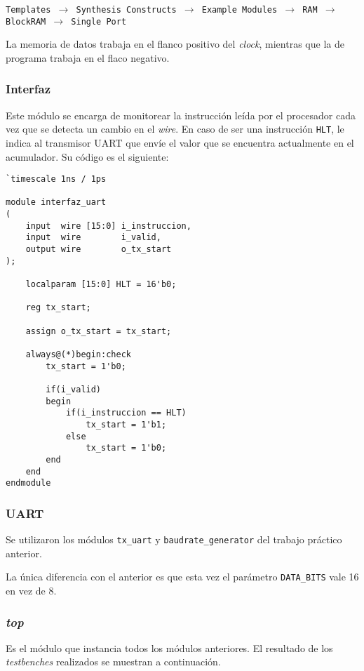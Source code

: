 \documentclass[12pt,a4paper]{article}
\begin{document}
\begin{center}

\footnotesize
\texttt{Templates $\rightarrow$ Synthesis Constructs $\rightarrow$  Example Modules $\rightarrow$  RAM $\rightarrow$ BlockRAM $\rightarrow$ Single Port}

\end{center}

La memoria de datos trabaja en el flanco positivo del \emph{clock}, mientras que la de programa trabaja en el flaco negativo.

\subsubsection{Interfaz}
\label{subss:iface}
Este módulo se encarga de monitorear la instrucción leída por el procesador cada vez que se detecta un cambio en el \emph{wire}. En caso de ser una instrucción \verb|HLT|, le indica al transmisor UART que envíe el valor que se encuentra actualmente en el acumulador. Su código es el siguiente:

\begin{lstlisting}[caption={Código fuente de ``interfaz\_uart''.}, label={cod:int-src}, language=ve]
`timescale 1ns / 1ps

module interfaz_uart
(
    input  wire [15:0] i_instruccion,
    input  wire        i_valid,
    output wire        o_tx_start
);

    localparam [15:0] HLT = 16'b0;

    reg tx_start;
    
    assign o_tx_start = tx_start;
    
    always@(*)begin:check
        tx_start = 1'b0; 
        
        if(i_valid)
        begin
            if(i_instruccion == HLT)
                tx_start = 1'b1;
            else
            	tx_start = 1'b0;
        end        
    end
endmodule
\end{lstlisting}

\newpage
\subsubsection{UART}
\label{subss:uart}
Se utilizaron los módulos \verb|tx_uart| y \verb|baudrate_generator| del trabajo práctico anterior.

La única diferencia con el anterior es que esta vez el parámetro \verb|DATA_BITS| vale 16 en vez de 8.


\subsubsection{\emph{top}}
\label{subss:top}
Es el módulo que instancia todos los módulos anteriores. El resultado de los \emph{testbenches} realizados se muestran a continuación.
\end{document}
